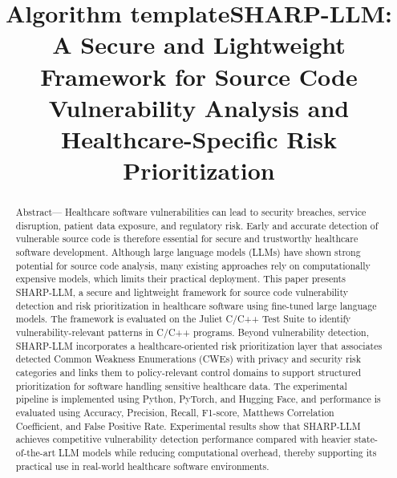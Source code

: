 \documentclass[conference]{IEEEtran}
\title{Algorithm template}
\begin{document}
\title{SHARP-LLM: A Secure and Lightweight Framework for Source Code Vulnerability Analysis and Healthcare-Specific Risk Prioritization} \\

\author{
}

\maketitle

\begin{abstract}
Abstract— Healthcare software vulnerabilities can lead to security breaches, service disruption, patient data exposure, and regulatory risk. Early and accurate detection of vulnerable source code is therefore essential for secure and trustworthy healthcare software development. Although large language models (LLMs) have shown strong potential for source code analysis, many existing approaches rely on computationally expensive models, which limits their practical deployment. This paper presents SHARP-LLM, a secure and lightweight framework for source code vulnerability detection and risk prioritization in healthcare software using fine-tuned large language models. The framework is evaluated on the Juliet C/C++ Test Suite to identify vulnerability-relevant patterns in C/C++ programs. Beyond vulnerability detection, SHARP-LLM incorporates a healthcare-oriented risk prioritization layer that associates detected Common Weakness Enumerations (CWEs) with privacy and security risk categories and links them to policy-relevant control domains to support structured prioritization for software handling sensitive healthcare data. The experimental pipeline is implemented using Python, PyTorch, and Hugging Face, and performance is evaluated using Accuracy, Precision, Recall, F1-score, Matthews Correlation Coefficient, and False Positive Rate. Experimental results show that SHARP-LLM achieves competitive vulnerability detection performance compared with heavier state-of-the-art LLM models while reducing computational overhead, thereby supporting its practical use in real-world healthcare software environments.
\end{abstract}
\end{document}
